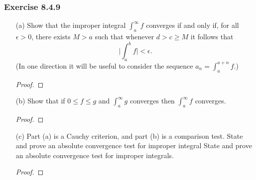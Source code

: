 \subsubsection{Exercise 8.4.9} 
\begin{enumerate}
    \item[(a)] Show that the improper integral \( \int_{ a }^{ \infty  } f  \) converges if and only if, for all \( \epsilon > 0 \), there exists \( M > a  \) such that whenever \( d > c \geq M  \) it follows that 
        \[  \Big| \int_{ a }^{ b } f  \Big|  < \epsilon. \]
        (In one direction it will be useful to consider the sequence \( a_{n} = \int_{ a }^{ a+ n  } f  \).)
        \begin{proof}
        
        \end{proof}
    \item[(b)] Show that if \( 0 \leq f \leq g  \) and \( \int_{ a }^{ \infty  } g   \) converges then \( \int_{ a }^{ \infty  } f   \) converges.
        \begin{proof}
        
        \end{proof}
    \item[(c)] Part (a) is a Cauchy criterion, and part (b) is a comparison test. State and prove an absolute convergence test for improper integral State and prove an absolute convergence test for improper integrals. 
        \begin{proof}
        
        \end{proof}
\end{enumerate}







